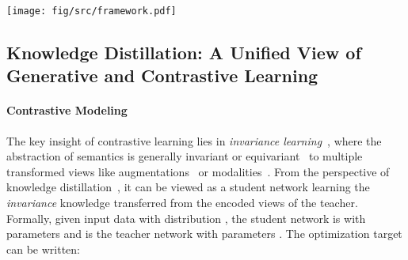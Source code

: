 \documentclass{article}
\theoremstyle{plain}
\theoremstyle{definition}
\theoremstyle{remark}
\def\recon{{\scshape ReCon}}
\begin{document}
\begin{figure*}[ht!]
    \begin{center}
    \vspace{-4pt}
    \texttt{[image: fig/src/framework.pdf]}
    \vspace{-12pt}
    \caption{\textbf{Overview of \recon}. \recon\ can be applied to \textit{either} single-modal 3D point clouds inputs \textit{or} cross-modal inputs with rendered RGB images and text descriptions, which will be encoded as sequential tokens. The 3D token embeddings are then masked for \textit{generative} reconstruction for the local 3D encoder, where the encoded intermediate embeddings are fed to the global 3D decoder with stop-gradient (stop-grad) through cross-attention. The \textit{global queries} are learnable and supervised by global \textit{contrastive} learning. 
    }\label{fig:framework}
    \vspace{-15pt}
    \end{center}
\end{figure*} \subsection{Knowledge Distillation: A Unified View of Generative and Contrastive Learning}\label{sec:kd_view}
\paragraph{Contrastive Modeling}
The key insight of contrastive learning lies in \textit{invariance learning}~\citep{InvarianceTheory11,MoCo,InvariantMIM22}, where the abstraction of semantics is generally invariant or equivariant~\citep{EquivariantSSL22} to multiple transformed views like augmentations~\citep{SimCLR} or modalities~\citep{CMC20}.
From the perspective of knowledge distillation~\citep{HintonKD15}, it can be viewed as a student network learning the \textit{invariance} knowledge transferred from the encoded views of the teacher. 
Formally, given input data  with distribution , the student network is  with parameters  and  is the teacher network with parameters . The optimization target can be written:
\end{document}
